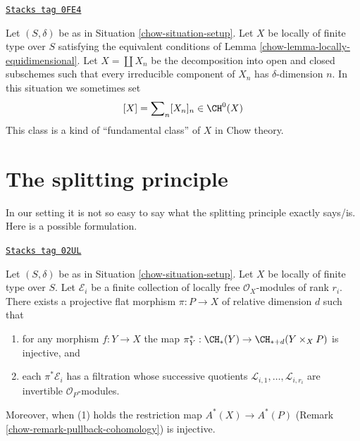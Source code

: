 \begin{remark}
\label{chow-remark-fundamental-class}
\href{https://stacks.math.columbia.edu/tag/0FE4}{\texttt{Stacks tag 0FE4}}

Let $(S, \delta)$ be as in Situation \ref{chow-situation-setup}.
Let $X$ be locally of finite type over $S$ satisfying the
equivalent conditions of Lemma \ref{chow-lemma-locally-equidimensional}.
Let $X = \coprod X_n$ be the decomposition into open and closed
subschemes such that every irreducible component of $X_n$ has
$\delta$-dimension $n$. In this situation we sometimes set
$$
[X] = \sum\nolimits_n [X_n]_n \in \CH^0(X)
$$
This class is a kind of ``fundamental class'' of $X$ in Chow theory.
\end{remark}

\section{The splitting principle}
\label{chow-section-splitting-principle}
In our setting it is not so easy to say what the splitting principle
exactly says/is. Here is a possible formulation.

\begin{lemma}
\label{chow-lemma-splitting-principle}
\href{https://stacks.math.columbia.edu/tag/02UL}{\texttt{Stacks tag 02UL}}

Let $(S, \delta)$ be as in Situation \ref{chow-situation-setup}. Let $X$ be locally
of finite type over $S$. Let $\mathcal{E}_i$ be a finite collection of
locally free $\mathcal{O}_X$-modules of rank $r_i$. There exists a projective
flat morphism $\pi : P \to X$ of relative dimension $d$ such that
\begin{enumerate}
\item for any morphism $f : Y \to X$ the map
$\pi_Y^* : \CH_*(Y) \to \CH_{* + d}(Y \times_X P)$ is injective, and
\item each $\pi^*\mathcal{E}_i$ has a filtration
whose successive quotients $\mathcal{L}_{i, 1}, \ldots, \mathcal{L}_{i, r_i}$
are invertible ${\mathcal O}_P$-modules.
\end{enumerate}
Moreover, when (1) holds the restriction map $A^*(X) \to A^*(P)$
(Remark \ref{chow-remark-pullback-cohomology}) is injective.
\end{lemma}

